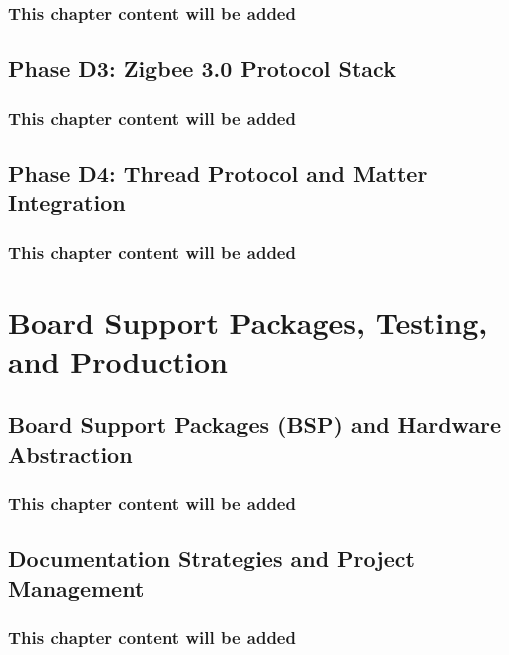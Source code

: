 \documentclass[11pt,a4paper,twoside,openright]{book}
\begin{document}
\section*{This chapter content will be added}
\clearpage

\chapter{Phase D3: Zigbee 3.0 Protocol Stack}
\label{ch:chapter-13}
\section*{This chapter content will be added}
\clearpage

\chapter{Phase D4: Thread Protocol and Matter Integration}
\label{ch:chapter-14}
\section*{This chapter content will be added}
\clearpage

\part{Board Support Packages, Testing, and Production}
\label{part:bsp-production}

\chapter{Board Support Packages (BSP) and Hardware Abstraction}
\label{ch:chapter-15}
\section*{This chapter content will be added}
\clearpage

\chapter{Documentation Strategies and Project Management}
\label{ch:chapter-16}
\section*{This chapter content will be added}
\clearpage
\end{document}
